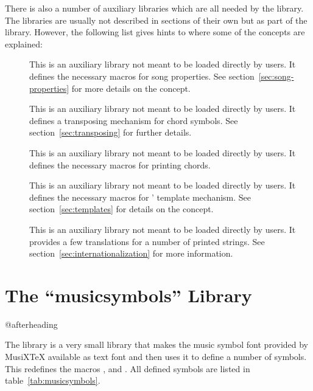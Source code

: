 \documentclass[load-preamble+]{cnltx-doc}
\def\library*#1{``#1''}%
\begin{document}
There is also a number of auxiliary libraries which are all needed by
the  library.  The libraries are usually not described in
sections of their own but as part of the  library.  However,
the following list gives hints to where some of the concepts are explained:
\begin{description}
  \item[] This is an auxiliary library not meant to be
    loaded directly by users.  It defines the necessary macros for song
    properties.  See section~\ref{sec:song-properties} for more details on the
    concept.
  \item[]  This is an auxiliary library not meant to be
    loaded directly by users.  It defines a transposing mechanism for chord
    symbols.  See section~\ref{sec:transposing} for further details.
  \item[]  This is an auxiliary library not meant to be
    loaded directly by users.  It defines the necessary macros for printing
    chords.
  \item[] This is an auxiliary library not meant to be
    loaded directly by users.  It defines the necessary macros for
    \leadsheets' template mechanism.  See section~\ref{sec:templates} for
    details on the concept.
  \item[] This is an auxiliary library not meant to be
    loaded directly by users.  It provides a few translations for a number of
    printed strings.  See section~\ref{sec:internationalization} for more
    information.
\end{description}

\part{The \library*{musicsymbols} Library}\label{part:musicsymbols-library}
\vspace*{\baselineskip}\csname @afterheading\endcsname

The \musicsymbols{} library is a very small library that makes the music
symbol font provided by MusiX\TeX{} available as text font and then uses it to
define a number of symbols.  This redefines the macros , 
and .  All defined symbols are listed in
table~\ref{tab:musicsymbols}.
\end{document}
